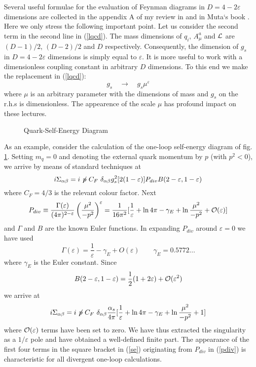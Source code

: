 \documentclass[12pt,rotate]{article}
\newcommand{\be}{\begin{equation}}
\newcommand{\ee}{\end{equation}}
\newcommand{\ord}{{\cal O}}
\begin{document}
\begin{itemize}
Several useful formulae for the evaluation of Feynman diagrams in
$D=4-2\varepsilon$ dimensions 
are collected in the appendix A of my review in \cite{AB80} and
in Muta`s book \cite{MUTA}. Here we only
stress the following important point. Let us consider the second
term in the second line in (\ref{lqcd}). The mass dimensions of
$q_i$, $A^a_\mu$ and ${\cal L}$ are $(D-1)/2$, $(D-2)/2$ and $D$
respectively. Consequently, the dimension of $g_s$ in $D=4-2\varepsilon$
dimensions is simply equal to $\varepsilon$. 
It is more useful to work with a
 dimensionless coupling constant in arbitrary $D$ dimensions. To this
end  we make the replacement in (\ref{lqcd}):
\be
g_s\quad \to \quad g_s \mu^\varepsilon
\ee
where $\mu$ is an arbitrary parameter with the dimensions of mass
and $g_s$ on the r.h.s is dimensionless. The appearence of the
scale $\mu$ has profound impact on these lectures.

\begin{figure}[hbt]
\vspace{0.10in}
\centerline{
\epsfysize=1in
}%
\vspace{0.08in}
\caption[]{Quark-Self-Energy Diagram 
\label{L:3}}
\end{figure}

As an example, consider the calculation of the one-loop self-energy
diagram of fig. \ref{L:3}. Setting
$m_q=0$ and denoting the external quark momentum by $p$ (with $p^2<0$), 
we arrive
by means of standard techniques at
\begin{equation}\label{isigma}
i \Sigma_{\alpha\beta}=i\not\! p~ C_F~ \delta_{\alpha\beta}
g^2_s [2 (1-\varepsilon)] P_{div} B(2-\varepsilon,1-\varepsilon)
\end{equation}
where $C_F=4/3$ is the relevant colour factor. Next
\begin{equation}\label{pdiv}
P_{div}\equiv \frac{\Gamma(\varepsilon)}{(4\pi)^{2-\varepsilon}}
\left(\frac{\mu^2}{-p^2}\right)^\varepsilon
=\frac{1}{16\pi^2}
\lbrack \frac{1}{\varepsilon}+\ln 4\pi-\gamma_E+\ln\frac{\mu^2}{-p^2}
+\ord(\varepsilon)
\rbrack
\end{equation}
and $\Gamma$ and $B$ are the known Euler functions. In expanding
$P_{div}$ around $\varepsilon=0$ we have used
\be
\Gamma(\varepsilon)=\frac{1}{\varepsilon}-\gamma_E+O(\varepsilon)
\qquad
\gamma_E=0.5772...
\ee
where $\gamma_E$ is the Euler constant. Since
\be
B(2-\varepsilon,1-\varepsilon)=\frac{1}{2}(1+2\varepsilon)+
\ord(\varepsilon^2)
\ee 
we arrive at
\begin{equation}\label{se}
i \Sigma_{\alpha\beta}=i\not\! p~ C_F~ \delta_{\alpha\beta}
\frac{\alpha_s}{4\pi}
\lbrack \frac{1}{\varepsilon}+\ln 4\pi-\gamma_E+\ln\frac{\mu^2}{-p^2}+1
\rbrack
\end{equation}
where $\ord(\varepsilon)$ terms have been set to zero.
We have thus extracted the singularity as a $1/\varepsilon$ pole
and have obtained a well-defined finite part. The appearance
of the first four terms
in the square bracket in (\ref{se}) originating from $P_{div}$ in
(\ref{pdiv}) is characteristic for all divergent one-loop calculations.


\end{itemize}
\end{document}
